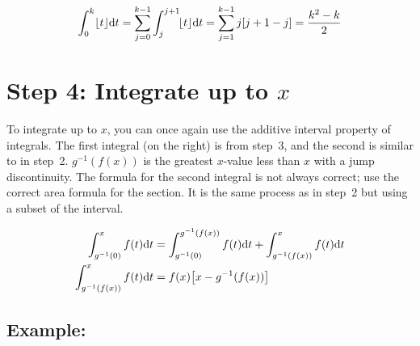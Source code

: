 \documentclass[12pt]{article}
\begin{document}
		\begin{align*}
			\int_0^k\lfloor t\rfloor\text dt
			= \sum_{j=0}^{k-1}\int_j^{j+1}\!\lfloor t\rfloor\text dt
			= \sum_{j=1}^{k-1}j[j+1-j]
			= \frac{k^2-k}2
		\end{align*}

\section*{Step 4: Integrate up to $x$}

	To integrate up to $x$, you can once again use the additive interval property of integrals. The first integral (on the right) is from step~3, and the second is similar to in step~2. $g^{-1}(f(x))$ is
	the greatest $x$-value less than $x$ with a jump discontinuity. The formula for the second integral
	is not always correct; use the correct area formula for the section. It is the same process as in
	step~2 but using a subset of the interval.

	\begin{align*}
		\int_{g^{-1}(0)}^xf(t)\text dt & = \int_{g^{-1}(0)}^{g^{-1}(f(x))}f(t)\text dt+\int_{g^{-1}(f(x))}^xf(t)\text dt\\
		\int_{g^{-1}(f(x))}^xf(t)\text dt & = f(x)\!\left[x-g^{-1}(f(x))\right]
	\end{align*}

	\subsection*{Example:}
\end{document}

